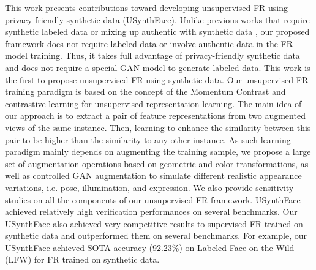 \documentclass[10pt,twocolumn,letterpaper]{ieeeconf}
\begin{document}
This work presents contributions toward developing unsupervised FR using privacy-friendly synthetic data (USynthFace).  
Unlike previous works that require synthetic labeled data \cite{SFace} or mixing up authentic with synthetic data \cite{SynFace}, our proposed framework does not require labeled data or involve authentic data in the FR model training. Thus, it takes full advantage of privacy-friendly synthetic data and does not require a special GAN model to generate labeled data. 
This work is the first to propose unsupervised FR using synthetic data. Our unsupervised FR training paradigm is based on the concept of the Momentum Contrast \cite{Moco} and contrastive learning \cite{InfoNCE} for unsupervised representation learning. 
The main idea of our approach is to extract a pair of feature representations from two augmented views of the same instance. Then,  learning to enhance the similarity between this pair to be higher than the similarity to any other instance. As such learning paradigm mainly depends on augmenting the training sample, we propose a large set of augmentation operations based on geometric and color transformations, as well as controlled GAN augmentation to simulate different realistic appearance variations, i.e. pose, illumination, and expression. We also provide sensitivity studies on all the components of our unsupervised FR framework.  USynthFace achieved relatively high verification performances on several benchmarks. Our USynthFace also achieved very competitive results to supervised FR trained on synthetic data and outperformed them on several benchmarks.  For example, our USynthFace achieved SOTA accuracy (92.23\%) on Labeled Face on the Wild (LFW) for FR trained on synthetic data.
\end{document}
